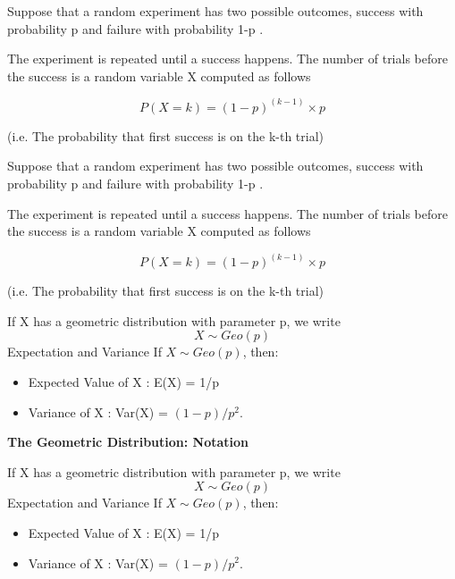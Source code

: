 \documentclass[]{report}
\begin{document}
{	
	Suppose that a random experiment has two possible outcomes, success
	with probability p and failure with probability 1-p .
	
	
	The experiment is repeated until a success happens. The number of
	trials before the success is a random variable X computed as follows
	
	\[P(X = k) = (1-p)^{(k-1)}\times p \]
	
	
	(i.e. The probability that first success is on the k-th trial)
}


	
	
	Suppose that a random experiment has two possible outcomes, success
	with probability p and failure with probability 1-p .
	
	
	The experiment is repeated until a success happens. The number of
	trials before the success is a random variable X computed as follows
	
	\[P(X = k) = (1-p)^{(k-1)}\times p \]
	
	
	(i.e. The probability that first success is on the k-th trial)
	
	
	If X has a geometric distribution with parameter p, we write
	\[X \sim Geo(p) \]
	Expectation and Variance
	If $X \sim Geo(p)$, then:
	
	\begin{itemize}
		\item Expected Value of X : E(X) = 1/p
		\item Variance of X : Var(X) = $(1-p)/p^2$.
	\end{itemize}



\textbf{The Geometric Distribution: Notation}
	
	If X has a geometric distribution with parameter p, we write
	\[X \sim Geo(p) \]
	Expectation and Variance
	If $X \sim Geo(p)$, then:
	
	\begin{itemize}
		\item Expected Value of X : E(X) = 1/p
		\item Variance of X : Var(X) = $(1-p)/p^2$.
	\end{itemize}
\newpage
\end{document}
